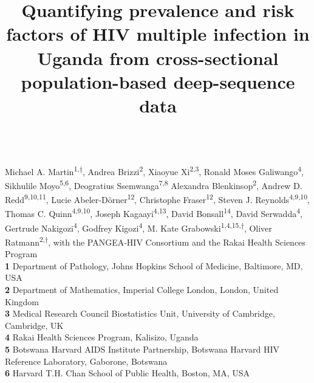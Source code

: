 \documentclass[10pt,letterpaper]{article}
\title{Quantifying prevalence and risk factors of HIV multiple infection in Uganda from cross-sectional population-based deep-sequence data}
\begin{document}

\begin{flushleft}

{\Large\textbf{} 
}
\newline
\\ 
Michael A. Martin\textsuperscript{1,$\dagger$},
Andrea Brizzi\textsuperscript{2},
Xiaoyue Xi\textsuperscript{2,3},
Ronald Moses Galiwango\textsuperscript{4},
Sikhulile Moyo\textsuperscript{5,6},
Deogratius Ssemwanga\textsuperscript{7,8}
Alexandra Blenkinsop\textsuperscript{2},
Andrew D. Redd\textsuperscript{9,10,11},
Lucie Abeler-Dörner\textsuperscript{12},
Christophe Fraser\textsuperscript{12},
Steven J. Reynolds\textsuperscript{4,9,10},
Thomas C. Quinn\textsuperscript{4,9,10},
Joseph Kagaayi\textsuperscript{4,13},
David Bonsall\textsuperscript{14},
David Serwadda\textsuperscript{4},
Gertrude Nakigozi\textsuperscript{4},
Godfrey Kigozi\textsuperscript{4},
M. Kate Grabowski\textsuperscript{1,4,15,$\dagger$},
Oliver Ratmann\textsuperscript{2,$\dagger$},
with the PANGEA-HIV Consortium and the Rakai Health Sciences Program
\\
\bigskip
\textbf{1} Department of Pathology, Johns Hopkins School of Medicine, Baltimore, MD, USA
\\
\textbf{2} Department of Mathematics, Imperial College London, London, United Kingdom
\\
\textbf{3} Medical Research Council Biostatistics Unit, University of Cambridge, Cambridge, UK \\

\textbf{4} Rakai Health Sciences Program, Kalisizo, Uganda \\

\textbf{5} Botswana Harvard AIDS Institute Partnership, Botswana Harvard HIV Reference Laboratory, Gaborone, Botswana \\

\textbf{6} Harvard T.H. Chan School of Public Health, Boston, MA, USA \\


\end{flushleft}
\end{document}
